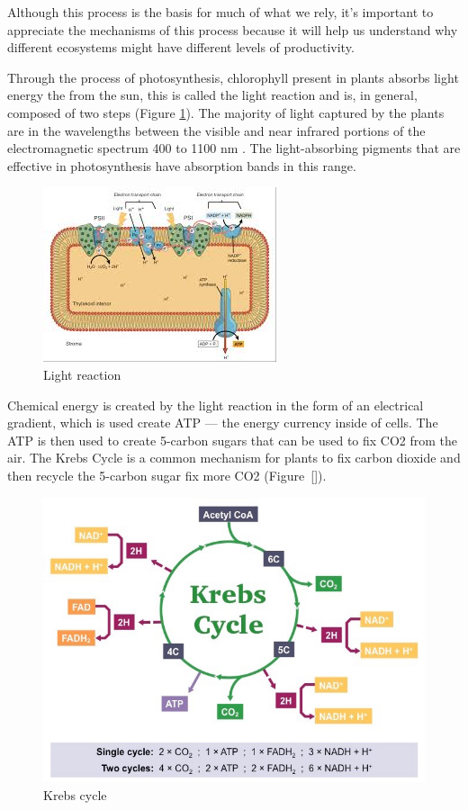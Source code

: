 Although this process is the basis for much of what we rely, it's important to appreciate the mechanisms of this process because it will help us understand why different ecosystems might have different levels of productivity. 

Through the process of \gls{photosynthesis}, chlorophyll present in plants absorbs light energy the from the sun, this is called the light reaction and is, in general, composed of two steps (Figure \ref{fig:light_rxn}). The majority of light captured by the plants are in the wavelengths between the visible and near infrared portions of the electromagnetic spectrum 400 to 1100 nm \citep{stenberg2010visible}. The light-absorbing pigments that are effective in photosynthesis have absorption bands in this range.

\begin{figure}[htb]
	\centering
		\includegraphics{graphics/light_rxn.jpg}
	\caption{Light reaction}
	\label{fig:light_rxn}
\end{figure}

Chemical energy is created by the light reaction in the form of an electrical gradient, which is used create ATP --- the energy currency inside of cells. The ATP is then used to create 5-carbon sugars that can be used to fix CO2 from the air. The Krebs Cycle is a common mechanism for plants to fix carbon dioxide and then recycle the 5-carbon sugar fix more CO2 (Figure~\ref{}). 

\begin{figure}[htb]
	\centering
		\includegraphics{graphics/krebs-cycle_med.jpeg}
	\caption{Krebs cycle}
	\label{fig:krebs-cycle_med}
\end{figure}


